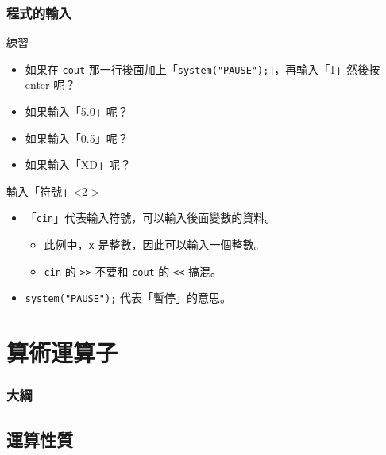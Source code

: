 \documentclass[utf8]{beamer}
\begin{document}
\begin{CJK}{UTF8}{bkai}
\begin{frame}
  \frametitle{程式的輸入}
  \begin{block}{練習}
    \begin{itemize}
    \item<1-> 如果在 \lstinline{cout} 那一行後面加上「\lstinline{system("PAUSE");}」，再輸入「1」然後按 enter 呢？
    \item<6-> 如果輸入「5.0」呢？
    \item<7-> 如果輸入「0.5」呢？
    \item<8-> 如果輸入「XD」呢？
    \end{itemize}
  \end{block}
  \begin{exampleblock}{輸入「符號」}<2->
    \begin{itemize}
    \item 「\lstinline{cin}」代表輸入符號，可以輸入後面變數的資料。
      \begin{itemize}
      \item<3-> 此例中，\lstinline{x} 是整數，因此可以\alert{輸入一個整數}。
      \item<4-> \lstinline{cin} 的 \alert{\lstinline{>>}} 不要和 \lstinline{cout} 的 \alert{\lstinline{<<}} 搞混。
      \end{itemize}
    \item<5-> \lstinline{system("PAUSE");} 代表「暫停」的意思。
    \end{itemize}
  \end{exampleblock}
\end{frame}

\section{算術運算子}
\begin{frame}
  \frametitle{大綱}
  \begin{multicols}{2}
    \tableofcontents[currentsection]
  \end{multicols}
\end{frame}

\subsection{運算性質}


\end{CJK}
\end{document}
